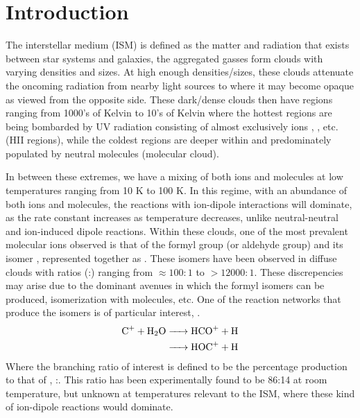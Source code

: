 \section{Introduction}

The interstellar medium (ISM) is defined as the matter and radiation that exists between star systems and galaxies, the aggregated gasses form clouds with varying densities and sizes. At high enough densities/sizes, these clouds attenuate the oncoming radiation from nearby light sources to where it may become opaque as viewed from the opposite side. These dark/dense clouds then have regions ranging from 1000's of Kelvin to 10's of Kelvin where the hottest regions are being bombarded by UV radiation consisting of almost exclusively ions , , etc. (HII regions), while the coldest regions are deeper within and predominately populated by neutral molecules (molecular cloud).

In between these extremes, we have a mixing of both ions and molecules at low temperatures ranging from 10 K to 100 K. In this regime, with an abundance of both ions and molecules, the reactions with ion-dipole interactions will dominate, as the rate constant increases as temperature decreases, unlike neutral-neutral and ion-induced dipole reactions. Within these clouds, one of the most prevalent molecular ions observed is that of the formyl group (or aldehyde group)  and its isomer , represented together as \ce{[HCO]+}. These isomers have been observed in diffuse clouds with ratios (:) ranging from $\approx100:1$ to $>12000:1$. These discrepencies may arise due to the dominant avenues in which the formyl isomers can be produced, isomerization with  molecules, etc. One of the reaction networks that produce the isomers is of particular interest, .
\begin{align}
	\ce{C+ + H2O & -> HCO+ + H} \label{r: C+H2O->HCO} \\
	\ce{& -> HOC+ + H} \label{r: C+H2O->HOC}
\end{align}
Where the branching ratio of interest is defined to be the percentage  production to that of , :. This ratio has been experimentally found to be 86:14 at room temperature\cite{Love1987}, but unknown at temperatures relevant to the ISM, where these kind of ion-dipole reactions would dominate.

